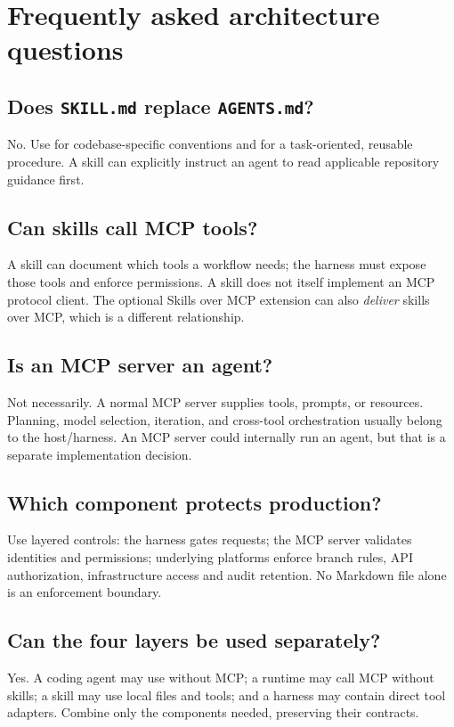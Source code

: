 \documentclass[11pt,letterpaper]{article}
\begin{document}
\section{Frequently asked architecture questions}
\subsection{Does \texttt{SKILL.md} replace \texttt{AGENTS.md}?}
No. Use  for codebase-specific conventions and  for a task-oriented, reusable procedure. A skill can explicitly instruct an agent to read applicable repository guidance first.

\subsection{Can skills call MCP tools?}
A skill can document which tools a workflow needs; the harness must expose those tools and enforce permissions. A skill does not itself implement an MCP protocol client. The optional Skills over MCP extension can also \emph{deliver} skills over MCP, which is a different relationship.\cite{mcpskills}

\subsection{Is an MCP server an agent?}
Not necessarily. A normal MCP server supplies tools, prompts, or resources. Planning, model selection, iteration, and cross-tool orchestration usually belong to the host/harness. An MCP server could internally run an agent, but that is a separate implementation decision.\cite{mcparch}

\subsection{Which component protects production?}
Use layered controls: the harness gates requests; the MCP server validates identities and permissions; underlying platforms enforce branch rules, API authorization, infrastructure access and audit retention. No Markdown file alone is an enforcement boundary.

\subsection{Can the four layers be used separately?}
Yes. A coding agent may use  without MCP; a runtime may call MCP without skills; a skill may use local files and tools; and a harness may contain direct tool adapters. Combine only the components needed, preserving their contracts.
\end{document}
